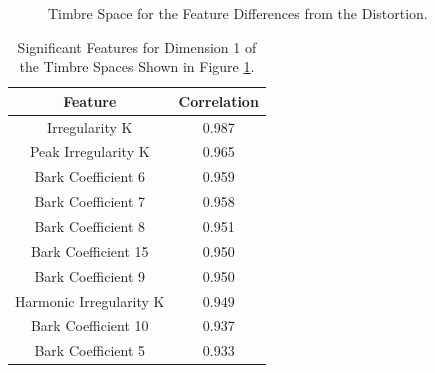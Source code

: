 	\begin{figure}[h!]
		\centering
		\qquad
		\caption{Timbre Space for the Feature Differences from the Distortion.}
		\label{fig:DistortionDifferenceMDSs}
	\end{figure}

	\begin{table}[h!]
		\centering
		\begin{tabular}{|c|c|}
			\hline
			\bf{Feature} & \bf{Correlation} \\
			\hline
			\hline
			Irregularity K & 0.987 \\
			\hline
			Peak Irregularity K & 0.965 \\
			\hline
			Bark Coefficient 6 & 0.959 \\
			\hline
			Bark Coefficient 7 & 0.958 \\
			\hline
			Bark Coefficient 8 & 0.951 \\
			\hline
			Bark Coefficient 15 & 0.950 \\
			\hline
			Bark Coefficient 9 & 0.950 \\
			\hline
			Harmonic Irregularity K & 0.949 \\
			\hline
			Bark Coefficient 10 & 0.937 \\
			\hline
			Bark Coefficient 5 & 0.933 \\
			\hline
		\end{tabular}
		\caption{Significant Features for Dimension 1 of the Timbre Spaces Shown in Figure 
			 \ref{fig:DistortionDifferenceMDSs}.}
		\label{tab:DistortionDifferenceFeatures}
	\end{table}

